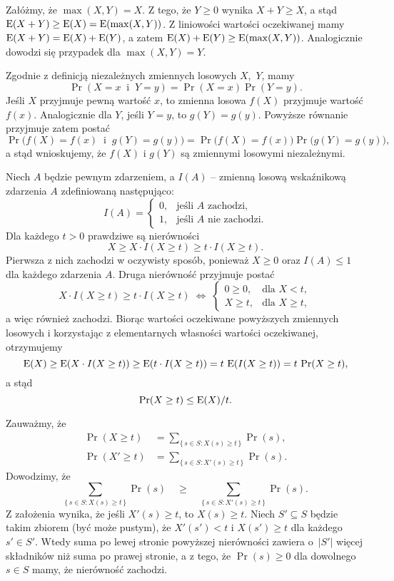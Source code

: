 \exercise{} %
Załóżmy, że $\max(X,Y)=X$. Z tego, że $Y\ge0$ wynika $X+Y\ge X$, a stąd $\operatorname{E}(X+Y)\ge\operatorname{E}(X)=\operatorname{E}(\max(X,Y))$. Z liniowości wartości oczekiwanej mamy $\operatorname{E}(X+Y)=\operatorname{E}(X)+\operatorname{E}(Y)$, a zatem $\operatorname{E}(X)+\operatorname{E}(Y)\ge\operatorname{E}(\max(X,Y))$. Analogicznie dowodzi się przypadek dla $\max(X,Y)=Y$.

\exercise{} %
Zgodnie z definicją niezależnych zmiennych losowych $X$,~$Y$, mamy
\[
	\Pr(X=x\;\;\text{i}\;\;Y=y) = \Pr(X=x)\Pr(Y=y).
\]
Jeśli $X$ przyjmuje pewną wartość $x$, to zmienna losowa $f(X)$ przyjmuje wartość $f(x)$. Analogicznie dla $Y$, jeśli $Y=y$, to $g(Y)=g(y)$. Powyższe równanie przyjmuje zatem postać
\[
	\Pr\bigl(f(X)=f(x)\;\;\text{i}\;\;g(Y)=g(y)\bigr) = \Pr\bigl(f(X)=f(x)\bigr)\Pr\bigl(g(Y)=g(y)\bigr),
\]
a stąd wnioskujemy, że $f(X)$ i $g(Y)$ są zmiennymi losowymi niezależnymi.

\exercise{} %
Niech $A$ będzie pewnym zdarzeniem, a $I(A)$ -- zmienną losową wskaźnikową zdarzenia $A$ zdefiniowaną następująco:
\[
	I(A) =
	\begin{cases}
		0, & \text{jeśli $A$ zachodzi,} \\
		1, & \text{jeśli $A$ nie zachodzi.}
	\end{cases}
\]
Dla każdego $t>0$ prawdziwe są nierówności
\[
	X\ge X\cdot I(X\ge t)\ge t\cdot I(X\ge t).
\]
Pierwsza z nich zachodzi w oczywisty sposób, ponieważ $X\ge0$ oraz $I(A)\le1$ dla każdego zdarzenia $A$. Druga nierówność przyjmuje postać
\[
	X\cdot I(X\ge t)\ge t\cdot I(X\ge t)\;\Leftrightarrow\;
	\begin{cases}
		0\ge0, & \text{dla $X<t$}, \\
		X\ge t, & \text{dla $X\ge t$},
	\end{cases}
\]
a więc również zachodzi. Biorąc wartości oczekiwane powyższych zmiennych losowych i korzystając z elementarnych własności wartości oczekiwanej, otrzymujemy
\[
	\operatorname{E}(X) \ge \operatorname{E}(X\cdot I(X\ge t)) \ge \operatorname{E}(t\cdot I(X\ge t)) = t\,\operatorname{E}(I(X\ge t)) = t\,\Pr(X\ge t),
\]
a stąd
\[
	\Pr(X\ge t) \le \operatorname{E}(X)/t.
\]

\exercise{} %
Zauważmy, że
\begin{align*}
	\Pr(X\ge t) &= \sum_{\{\,s\in S:X(s)\ge t\,\}}\Pr(s), \\
	\Pr(X'\ge t) &= \sum_{\{\,s\in S:X'(s)\ge t\,\}}\Pr(s).
\end{align*}
Dowodzimy, że
\[
	\sum_{\{\,s\in S:X(s)\ge t\,\}}\Pr(s)\quad \ge \quad\sum_{\{\,s\in S:X'(s)\ge t\,\}}\Pr(s).
\]
Z założenia wynika, że jeśli $X'(s)\ge t$, to $X(s)\ge t$. Niech $S'\subseteq S$ będzie takim zbiorem (być może pustym), że $X'(s')<t$ i $X(s')\ge t$ dla każdego $s'\in S'$. Wtedy suma po lewej stronie powyższej nierówności zawiera o~$|S'|$ więcej składników niż suma po prawej stronie, a z tego, że $\Pr(s)\ge0$ dla dowolnego $s\in S$ mamy, że nierówność zachodzi.

